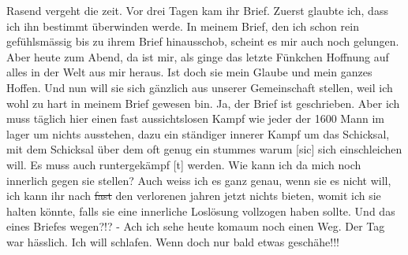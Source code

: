 \def\day{28.6. 1943.}
\mktitle

Rasend vergeht die zeit.
Vor drei Tagen kam ihr Brief.
Zuerst glaubte ich, dass ich ihn bestimmt \"{u}berwinden werde.
In meinem Brief, den ich schon rein gef\"{u}hlsm\"{a}ssig bis zu ihrem Brief hinausschob, scheint es mir auch noch gelungen.
Aber heute zum Abend, da ist mir, als ginge das letzte F\"{u}nkchen Hoffnung auf alles in der Welt aus mir heraus.
Ist  doch sie mein Glaube und mein ganzes Hoffen.
Und nun will sie sich g\"{a}nzlich aus unserer Gemeinschaft stellen, weil ich wohl zu hart in meinem Brief gewesen bin.
Ja, der Brief ist geschrieben.
Aber ich muss t\"{a}glich hier einen fast aussichtslosen Kampf wie jeder der 1600 Mann im lager um nichts ausstehen, dazu ein st\"{a}ndiger innerer Kampf um das Schicksal, mit dem Schicksal \"{u}ber dem oft genug ein stummes warum{\color{red} [sic] } sich einschleichen will.
Es muss auch runtergek\"{a}mpf{\color{red} [t] } werden.
Wie kann ich da mich noch innerlich gegen sie stellen?
Auch weiss ich es ganz genau, wenn sie es nicht will, ich kann ihr nach \st{fast} den verlorenen jahren jetzt nichts bieten, womit ich sie halten k\"{o}nnte, falls sie eine innerliche Losl\"{o}sung vollzogen haben sollte.
Und das eines Briefes wegen?!? -
Ach ich sehe heute komaum noch einen Weg.
Der Tag war h\"{a}sslich.
Ich will schlafen.
Wenn doch nur bald etwas gesch\"{a}he!!!

\clearpage
